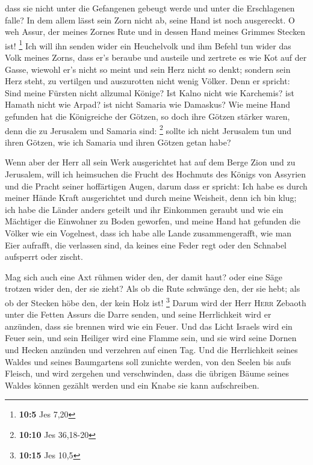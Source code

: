  dass sie nicht unter die Gefangenen gebeugt werde und
unter die Erschlagenen falle? In dem allem lässt sein Zorn nicht ab,
seine Hand ist noch ausgereckt.  O weh Assur, der meines
Zornes Rute und in dessen Hand meines Grimmes Stecken ist! \footnote{\textbf{10:5}
  Jes 7,20}  Ich will ihn senden wider ein Heuchelvolk und
ihm Befehl tun wider das Volk meines Zorns, dass er's beraube und
austeile und zertrete es wie Kot auf der Gasse,  wiewohl
er's nicht so meint und sein Herz nicht so denkt; sondern sein Herz
steht, zu vertilgen und auszurotten nicht wenig Völker. 
Denn er spricht: Sind meine Fürsten nicht allzumal Könige?
 Ist Kalno nicht wie Karchemis? ist Hamath nicht wie
Arpad? ist nicht Samaria wie Damaskus?  Wie meine Hand
gefunden hat die Königreiche der Götzen, so doch ihre Götzen stärker
waren, denn die zu Jerusalem und Samaria sind: \footnote{\textbf{10:10}
  Jes 36,18-20}  sollte ich nicht Jerusalem tun und ihren
Götzen, wie ich Samaria und ihren Götzen getan habe?

 Wenn aber der Herr all sein Werk ausgerichtet hat auf
dem Berge Zion und zu Jerusalem, will ich heimsuchen die Frucht des
Hochmuts des Königs von Assyrien und die Pracht seiner hoffärtigen
Augen,  darum dass er spricht: Ich habe es durch meiner
Hände Kraft ausgerichtet und durch meine Weisheit, denn ich bin klug;
ich habe die Länder anders geteilt und ihr Einkommen geraubt und wie ein
Mächtiger die Einwohner zu Boden geworfen,  und meine
Hand hat gefunden die Völker wie ein Vogelnest, dass ich habe alle Lande
zusammengerafft, wie man Eier aufrafft, die verlassen sind, da keines
eine Feder regt oder den Schnabel aufsperrt oder zischt.

 Mag sich auch eine Axt rühmen wider den, der damit haut?
oder eine Säge trotzen wider den, der sie zieht? Als ob die Rute
schwänge den, der sie hebt; als ob der Stecken höbe den, der kein Holz
ist! \footnote{\textbf{10:15} Jes 10,5}  Darum wird der
Herr \textsc{Herr} Zebaoth unter die Fetten Assurs die Darre senden, und
seine Herrlichkeit wird er anzünden, dass sie brennen wird wie ein
Feuer.  Und das Licht Israels wird ein Feuer sein, und
sein Heiliger wird eine Flamme sein, und sie wird seine Dornen und
Hecken anzünden und verzehren auf einen Tag.  Und die
Herrlichkeit seines Waldes und seines Baumgartens soll zunichte werden,
von den Seelen bis aufs Fleisch, und wird zergehen und verschwinden,
 dass die übrigen Bäume seines Waldes können gezählt
werden und ein Knabe sie kann aufschreiben.

